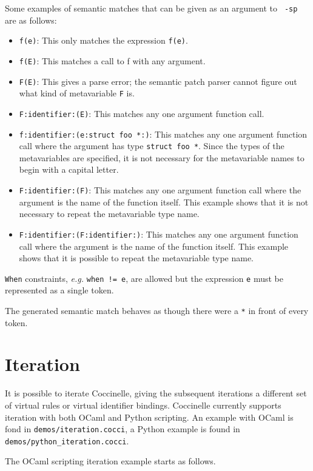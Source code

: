 Some examples of semantic matches that can be given as an argument to {\tt
  -sp} are as follows:

\begin{itemize}
\item \texttt{f(e)}: This only matches the expression \texttt{f(e)}.
\item \texttt{f(E)}: This matches a call to f with any argument.
\item \texttt{F(E)}: This gives a parse error; the semantic patch parser
  cannot figure out what kind of metavariable \texttt{F} is.
\item \texttt{F:identifier:(E)}: This matches any one argument function
  call.
\item \texttt{f:identifier:(e:struct foo *:)}: This matches any one
  argument function call where the argument has type \texttt{struct foo
    *}.  Since the types of the metavariables are specified, it is not
  necessary for the metavariable names to begin with a capital letter.
\item \texttt{F:identifier:(F)}: This matches any one argument function call
  where the argument is the name of the function itself.  This example
  shows that it is not necessary to repeat the metavariable type name.
\item \texttt{F:identifier:(F:identifier:)}: This matches any one argument
  function call
  where the argument is the name of the function itself.  This example
  shows that it is possible to repeat the metavariable type name.
\end{itemize}

\texttt{When} constraints, \textit{e.g.} \texttt{when != e}, are allowed
but the expression \texttt{e} must be represented as a single token.

The generated semantic match behaves as though there were a \texttt{*} in front
of every token.

\section{Iteration}

It is possible to iterate Coccinelle, giving the subsequent iterations a
different set of virtual rules or virtual identifier bindings.  Coccinelle
currently supports iteration with both OCaml and Python scripting. An
example with OCaml is fond in {\tt demos/iteration.cocci}, a Python
example is found in {\tt demos/python\_iteration.cocci}.

The OCaml scripting iteration example starts as follows.


